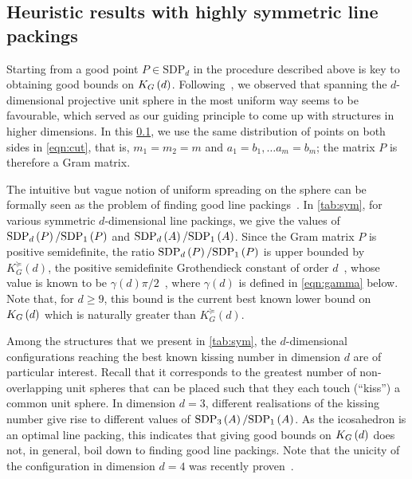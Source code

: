 \documentclass[10pt,aps,notitlepage,onecolumn,pra,superscriptaddress]{revtex4-1}
\renewcommand{\geq}{\geqslant}
\newcommand\cut[2]{\mathrm{SDP}_{#1}^{#2}}
\newcommand\KG[2]{K_G\left({#1}\ifx#2\empty\else\mapsto\fi{#2}\right)}
\newcommand\sdp[2]{\mathrm{SDP}_{#1}\ifx#2\empty\else\left({#2}\right)\fi}
\begin{document}
\subsection{Heuristic results with highly symmetric line packings}
\label{sec:sym}

Starting from a good point $P\in\cut{d}{}$ in the procedure described above is key to obtaining good bounds on $\KG{d}{}$.
Following~\cite{DBV17}, we observed that spanning the $d$-dimensional projective unit sphere in the most uniform way seems to be favourable, which served as our guiding principle to come up with structures in higher dimensions.
In this \cref{sec:sym}, we use the same distribution of points on both sides in \cref{eqn:cut}, that is, $m_1=m_2=m$ and $a_1=b_1,\ldots a_m=b_m$; the matrix $P$ is therefore a Gram matrix.

The intuitive but vague notion of uniform spreading on the sphere can be formally seen as the problem of finding good line packings~\cite{CHS96,FJM18}.
In \cref{tab:sym}, for various symmetric $d$-dimensional line packings, we give the values of $\sdp{d}{P}/\sdp{1}{P}$ and $\sdp{d}{A}/\sdp{1}{A}$.
Since the Gram matrix $P$ is positive semidefinite, the ratio $\sdp{d}{P}/\sdp{1}{P}$ is upper bounded by $K_G^\succeq(d)$, the positive semidefinite Grothendieck constant of order $d$~\cite{BOV10}, whose value is known to be $\gamma(d)\pi/2$~\cite[Theorem~4.1.3]{Bri11}, where $\gamma(d)$ is defined in \cref{eqn:gamma} below.
Note that, for $d\geq9$, this bound is the current best known lower bound on $\KG{d}{}$ which is naturally greater than $K_G^\succeq(d)$.

Among the structures that we present in \cref{tab:sym}, the $d$-dimensional configurations reaching the best known kissing number in dimension $d$ are of particular interest.
Recall that it corresponds to the greatest number of non-overlapping unit spheres that can be placed such that they each touch (``kiss'') a common unit sphere.
In dimension $d=3$, different realisations of the kissing number give rise to different values of $\sdp{3}{A}/\sdp{1}{A}$.
As the icosahedron is an optimal line packing, this indicates that giving good bounds on $\KG{d}{}$ does not, in general, boil down to finding good line packings.
Note that the unicity of the configuration in dimension $d=4$ was recently proven~\cite{LLM24}.
\end{document}

